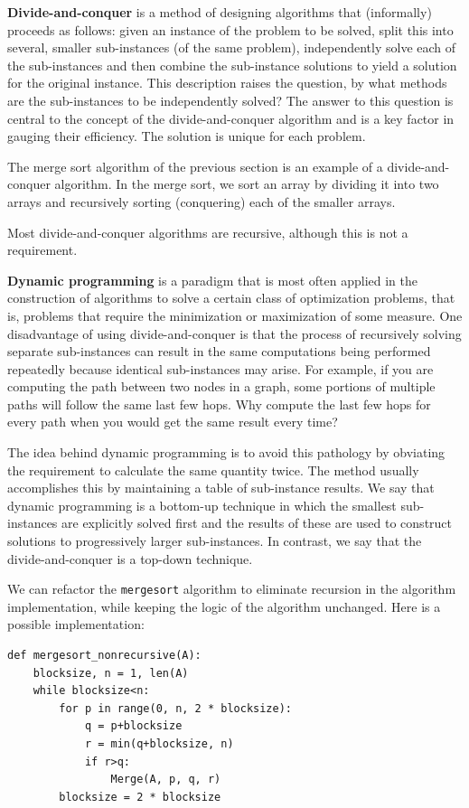 \documentclass[justified, sixbynine]{tufte-book}
\def\ft{\small\tt}
\theoremstyle{plain}%
\newtheorem * {corollary}{Corollary}
\theoremstyle{definition}
\theoremstyle{remark}
\newtheorem * {remark}{Remark}
\newtheorem * {note}{Note}
\begin{document}
\begin{fullwidth}

{\bf Divide-and-conquer}
 is a method of designing algorithms that
(informally) proceeds as follows: given an instance of the problem to be
solved, split this into several, smaller sub-instances (of the same
problem), independently solve each of the sub-instances and then combine the
sub-instance solutions to yield a solution for the original instance.
This description raises the question, by what methods are the sub-instances
to be independently solved? The answer to this question is central to the
concept of the divide-and-conquer algorithm and is a key factor in gauging
their efficiency. The solution is unique for each problem.

The merge sort algorithm of the previous section is an example of a divide-and-conquer algorithm. In the merge sort, we sort an array by dividing it into two arrays and recursively sorting (conquering) each of the smaller arrays.

Most divide-and-conquer algorithms are recursive, although this is not a requirement.

{\bf Dynamic programming}
is a paradigm that is most often applied in the
construction of algorithms to solve a certain class of optimization
problems, that is, problems that require the minimization or maximization of
some measure. One disadvantage of using divide-and-conquer is that the
process of recursively solving separate sub-instances can result in the same
computations being performed repeatedly because identical sub-instances may
arise. For example, if you are computing the path between two nodes in a graph, 
some portions of multiple paths will follow the same last few hops. Why compute
the last few hops for every path when you would get the same result every time?

The idea behind dynamic programming is to avoid this pathology by
obviating the requirement to calculate the same quantity twice. The method
usually accomplishes this by maintaining a table of sub-instance results. We
say that dynamic programming is a bottom-up technique in which the smallest
sub-instances are explicitly solved first and the results of these are used to
construct solutions to progressively larger sub-instances. In contrast, we
say that the divide-and-conquer is a top-down technique.


We can refactor the {\ft mergesort} algorithm to eliminate recursion in the algorithm implementation, while keeping the logic of the algorithm unchanged. Here is a possible implementation:
\begin{lstlisting}
def mergesort_nonrecursive(A):
    blocksize, n = 1, len(A)
    while blocksize<n:
        for p in range(0, n, 2 * blocksize):
            q = p+blocksize
            r = min(q+blocksize, n)
            if r>q:
                Merge(A, p, q, r)
        blocksize = 2 * blocksize
\end{lstlisting}


\end{fullwidth}
\end{document}
